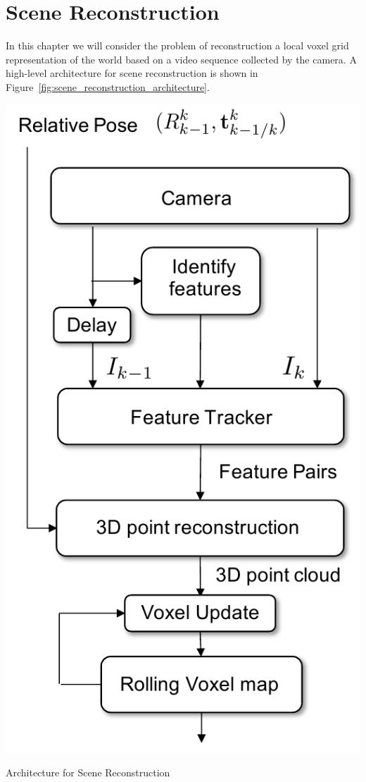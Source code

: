 \chapter{Scene Reconstruction}
\label{chap:scene_reconstruction}

In this chapter we will consider the problem of reconstruction a local voxel grid representation of the world based on a video sequence collected by the camera.  A high-level architecture for scene reconstruction is shown in Figure~\ref{fig:scene_reconstruction_architecture}.
%
\begin{marginfigure}[0in]
	\includegraphics[width=\linewidth]{chap8_scene_reconstruction/figures/scene_reconstruction_architecture}
	\caption{Architecture for Scene Reconstruction}
	\label{fig:scene_reconstruction_architecture}  
\end{marginfigure}
